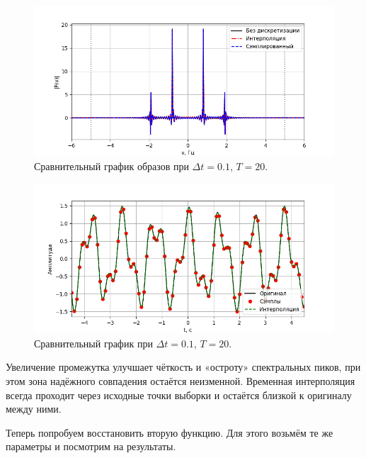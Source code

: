 \documentclass[a4paper]{article}
\begin{document}
\begin{figure}[H]
  \centering
  \includegraphics[width=\textwidth]{src/task_2/1_freq_20_0.1.png}
  \caption{Сравнительный график образов при $\Delta t=0.1$, $T=20$.} 
\end{figure}
\begin{figure}[H]
  \centering
  \includegraphics[width=\textwidth]{src/task_2/1_time_20_0.1.png}
  \caption{Сравнительный график при $\Delta t=0.1$, $T=20$.} 
\end{figure}
\noindent Увеличение промежутка улучшает чёткость и «остроту» спектральных пиков, при этом зона надёжного совпадения остаётся неизменной. Временная интерполяция всегда проходит через исходные точки выборки и остаётся близкой к оригиналу между ними.

Теперь попробуем восстановить вторую функцию. Для этого возьмём те же параметры и посмотрим на результаты.
\end{document}
